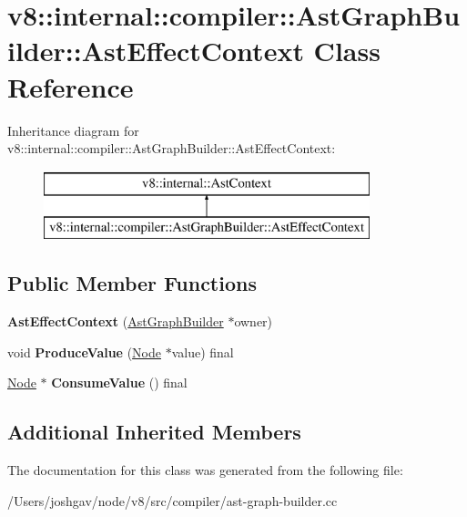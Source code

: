 \hypertarget{classv8_1_1internal_1_1compiler_1_1_ast_graph_builder_1_1_ast_effect_context}{}\section{v8\+:\+:internal\+:\+:compiler\+:\+:Ast\+Graph\+Builder\+:\+:Ast\+Effect\+Context Class Reference}
\label{classv8_1_1internal_1_1compiler_1_1_ast_graph_builder_1_1_ast_effect_context}
Inheritance diagram for v8\+:\+:internal\+:\+:compiler\+:\+:Ast\+Graph\+Builder\+:\+:Ast\+Effect\+Context\+:\begin{figure}[H]
\begin{center}
\leavevmode
\includegraphics[height=2.000000cm]{classv8_1_1internal_1_1compiler_1_1_ast_graph_builder_1_1_ast_effect_context}
\end{center}
\end{figure}
\subsection*{Public Member Functions}
\begin{DoxyCompactItemize}
\item 
{\bfseries Ast\+Effect\+Context} (\hyperlink{classv8_1_1internal_1_1compiler_1_1_ast_graph_builder}{Ast\+Graph\+Builder} $\ast$owner)\hypertarget{classv8_1_1internal_1_1compiler_1_1_ast_graph_builder_1_1_ast_effect_context_adf14ed66a249bcff0d66e9bde5c4a734}{}\label{classv8_1_1internal_1_1compiler_1_1_ast_graph_builder_1_1_ast_effect_context_adf14ed66a249bcff0d66e9bde5c4a734}

\item 
void {\bfseries Produce\+Value} (\hyperlink{classv8_1_1internal_1_1compiler_1_1_node}{Node} $\ast$value) final\hypertarget{classv8_1_1internal_1_1compiler_1_1_ast_graph_builder_1_1_ast_effect_context_aa50243c25869b0ce924f483319aefa82}{}\label{classv8_1_1internal_1_1compiler_1_1_ast_graph_builder_1_1_ast_effect_context_aa50243c25869b0ce924f483319aefa82}

\item 
\hyperlink{classv8_1_1internal_1_1compiler_1_1_node}{Node} $\ast$ {\bfseries Consume\+Value} () final\hypertarget{classv8_1_1internal_1_1compiler_1_1_ast_graph_builder_1_1_ast_effect_context_aaa6bab35766efbae68927770efbbf3f8}{}\label{classv8_1_1internal_1_1compiler_1_1_ast_graph_builder_1_1_ast_effect_context_aaa6bab35766efbae68927770efbbf3f8}

\end{DoxyCompactItemize}
\subsection*{Additional Inherited Members}


The documentation for this class was generated from the following file\+:\begin{DoxyCompactItemize}
\item 
/\+Users/joshgav/node/v8/src/compiler/ast-\/graph-\/builder.\+cc\end{DoxyCompactItemize}
